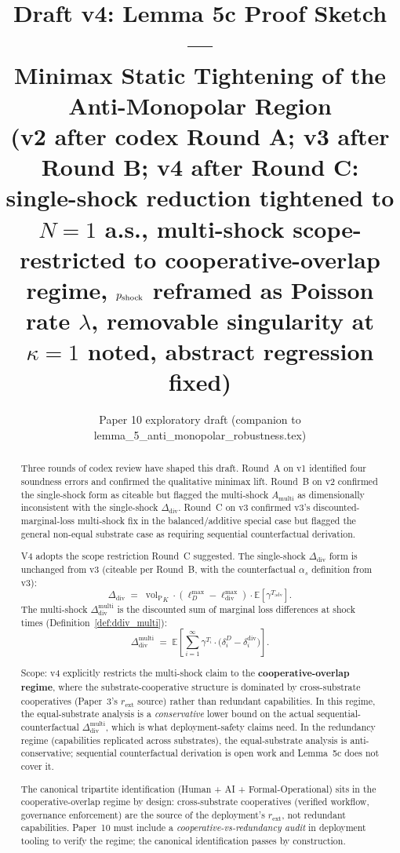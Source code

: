 \documentclass{article}
\title{Draft v4: Lemma 5c Proof Sketch ---\\
  Minimax Static Tightening of the Anti-Monopolar Region\\
  \large{(v2 after codex Round A; v3 after Round B; v4 after Round C:
  single-shock reduction tightened to $N=1$ a.s., multi-shock
  scope-restricted to cooperative-overlap regime, $p_{\mathrm{shock}}$ reframed
  as Poisson rate $\lambda$, removable singularity at $\kappa=1$
  noted, abstract regression fixed)}}
\author{Paper 10 exploratory draft (companion to lemma\_5\_anti\_monopolar\_robustness.tex)}
\date{}
\DeclareMathOperator{\vol}{vol}
\newcommand{\volL}{{\vol_{\mathrm{P}}}}
\newcommand{\rext}{r_{\mathrm{ext}}}
\newcommand{\Tadv}{T_{\mathrm{adv}}}
\newcommand{\Ddiv}{\Delta_{\mathrm{div}}}
\newcommand{\lossDmax}{\ell_D^{\max}}
\newcommand{\lossdivmax}{\ell_{\mathrm{div}}^{\max}}
\begin{document}
\maketitle

\begin{abstract}
Three rounds of codex review have shaped this draft.  Round~A on v1
identified four soundness errors and confirmed the qualitative
minimax lift.  Round~B on v2 confirmed the single-shock form as
citeable but flagged the multi-shock $A_{\mathrm{multi}}$ as
dimensionally inconsistent with the single-shock $\Ddiv$.  Round~C
on v3 confirmed v3's discounted-marginal-loss multi-shock fix in
the balanced/additive special case but flagged the general
non-equal substrate case as requiring sequential counterfactual
derivation.

V4 adopts the scope restriction Round~C suggested.  The single-shock
$\Ddiv$ form is unchanged from v3 (citeable per Round~B, with the
counterfactual $\alpha_s$ definition from v3):
\[
  \Ddiv \;=\; \volL_K \cdot (\lossDmax - \lossdivmax) \cdot
  \mathbb{E}[\gamma^{\Tadv}].
\]
The multi-shock $\Ddiv^{\mathrm{multi}}$ is the discounted sum of
marginal loss differences at shock times
(Definition~\ref{def:ddiv_multi}):
\[
  \Ddiv^{\mathrm{multi}} \;=\; \mathbb{E}\!\left[\sum_{i=1}^{\infty}
  \gamma^{T_i} \cdot
  \bigl(\delta_i^D - \delta_i^{\mathrm{div}}\bigr)\right].
\]

Scope: v4 explicitly restricts the multi-shock claim to the
\textbf{cooperative-overlap regime}, where the substrate-cooperative
structure is dominated by cross-substrate cooperatives (Paper~3's
$\rext$ source) rather than redundant capabilities.  In this regime,
the equal-substrate analysis is a \emph{conservative} lower bound on
the actual sequential-counterfactual $\Ddiv^{\mathrm{multi}}$, which
is what deployment-safety claims need.  In the redundancy regime
(capabilities replicated across substrates), the equal-substrate
analysis is anti-conservative; sequential counterfactual derivation
is open work and Lemma~5c does not cover it.

The canonical tripartite identification (Human + AI +
Formal-Operational) sits in the cooperative-overlap regime by
design: cross-substrate cooperatives (verified workflow, governance
enforcement) are the source of the deployment's $\rext$, not
redundant capabilities.  Paper~10 must include a
\emph{cooperative-vs-redundancy audit} in deployment tooling to
verify the regime; the canonical identification passes by
construction.


\end{abstract}
\end{document}
